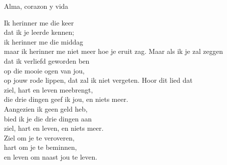 \begin{song}[vals]{Alma, corazon y vida}
\begin{translation}
Ik herinner me die keer\\
dat ik je leerde kennen;\\
ik herinner me die middag\\
maar ik herinner me niet meer hoe je eruit zag.\vspace{2ex}
Maar als ik je zal zeggen\\
dat ik verliefd geworden ben\\
op die mooie ogen van jou,\\
op jouw rode lippen, dat zal ik niet vergeten.\vspace{2ex}
Hoor dit lied dat\\
ziel, hart en leven meebrengt,\\
die drie dingen geef ik jou, en niets meer.\\
Aangezien ik geen geld heb,\\
bied ik je die drie dingen aan\\
ziel, hart en leven, en niets meer.\\
Ziel om je te veroveren,\\
hart om je te beminnen,\\
en leven om naast jou te leven.
\end{translation}
\end{song}
